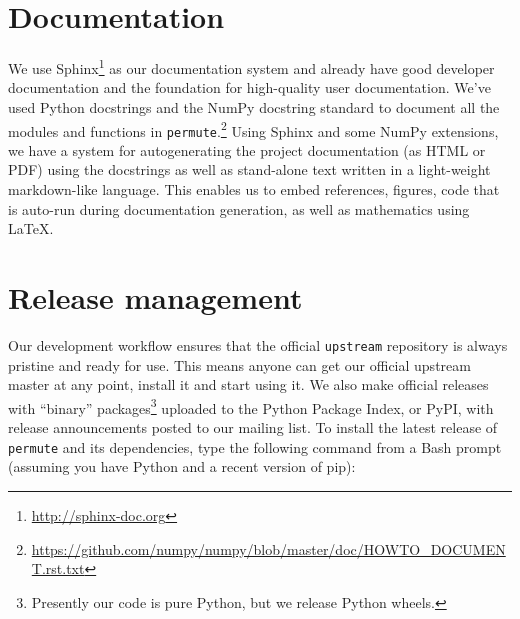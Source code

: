 %
%
%
%
%

\section{\label{sec:doc}Documentation}


We use Sphinx\footnote{\url{http://sphinx-doc.org}} as our documentation system
and already have good developer documentation and the foundation for
high-quality user documentation. We've used Python docstrings and the NumPy
docstring standard to document all the modules and functions in
\texttt{permute}.\footnote{\url{https://github.com/numpy/numpy/blob/master/doc/HOWTO\_DOCUMENT.rst.txt}}
Using Sphinx and some NumPy extensions, we have a system for autogenerating the
project documentation (as HTML or PDF) using the docstrings as well as
stand-alone text written in a light-weight markdown-like language.  This
enables us to embed references, figures, code that is auto-run during
documentation generation, as well as mathematics using \LaTeX.

%

\section{\label{sec:release}Release management}

Our development workflow ensures that the official \texttt{upstream} repository
is always pristine and ready for use.  This means anyone can get our official
upstream master at any point, install it and start using it.  We also 
make official releases with ``binary'' packages\footnote{Presently our code is pure
Python, but we release Python wheels.}
uploaded to the Python Package Index, or PyPI, with release announcements posted
to our mailing list.
To install the latest release of \texttt{permute} and its dependencies, type
the following command from a Bash prompt (assuming you have Python and a recent version of pip): 

